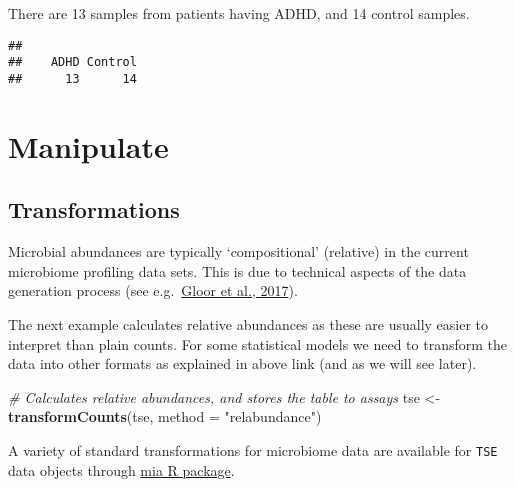 \documentclass[
  oneside]{book}
\newenvironment{Shaded}{\begin{snugshade}}{\end{snugshade}}
\newcommand{\CommentTok}[1]{\textcolor[rgb]{0.56,0.35,0.01}{\textit{#1}}}
\newcommand{\DataTypeTok}[1]{\textcolor[rgb]{0.13,0.29,0.53}{#1}}
\newcommand{\KeywordTok}[1]{\textcolor[rgb]{0.13,0.29,0.53}{\textbf{#1}}}
\newcommand{\NormalTok}[1]{#1}
\newcommand{\OperatorTok}[1]{\textcolor[rgb]{0.81,0.36,0.00}{\textbf{#1}}}
\newcommand{\StringTok}[1]{\textcolor[rgb]{0.31,0.60,0.02}{#1}}
\begin{document}
There are 13
samples from patients having ADHD,
and 14 control samples.

\begin{Shaded}
\end{Shaded}

\begin{verbatim}
## 
##    ADHD Control 
##      13      14
\end{verbatim}

\hypertarget{manipulate}{%
\section{Manipulate}\label{manipulate}}

\hypertarget{transformations}{%
\subsection{Transformations}\label{transformations}}

Microbial abundances are typically `compositional' (relative) in the
current microbiome profiling data sets. This is due to technical
aspects of the data generation process (see e.g.~\href{https://www.frontiersin.org/articles/10.3389/fmicb.2017.02224/full}{Gloor et al.,
2017}).

The next example calculates relative abundances as these are usually easier to
interpret than plain counts. For some statistical models we need to
transform the data into other formats as explained in above link (and
as we will see later).

\begin{Shaded}
\begin{Highlighting}[]
\CommentTok{# Calculates relative abundances, and stores the table to assays}
\NormalTok{tse <-}\StringTok{ }\KeywordTok{transformCounts}\NormalTok{(tse, }\DataTypeTok{method =} \StringTok{"relabundance"}\NormalTok{)}
\end{Highlighting}
\end{Shaded}

A variety of standard transformations for microbiome data are available for \texttt{TSE} data objects through \href{https://microbiome.github.io/mia/reference/transformCounts.html}{mia R package}.
\end{document}
